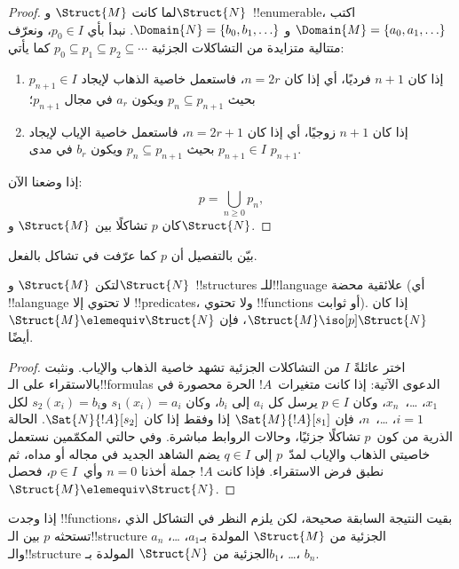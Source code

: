 \documentclass[../../../include/open-logic-section]{subfiles}
\begin{document}
\begin{proof}
  لما كانت $\Struct{M}$ و$\Struct{N}$~!!{enumerable}، اكتب
  $\Domain{M} = \{a_0, a_1, \ldots \}$ و
  $\Domain{N} = \{b_0, b_1, \ldots \}$. نبدأ بأي $p_0 \in I$، ونعرّف
  متتالية متزايدة من التشاكلات الجزئية
  $p_0 \subseteq p_1 \subseteq p_2 \subseteq \cdots$ كما يأتي:
  \begin{enumerate}
  \item إذا كان $n+1$ فرديًا، أي إذا كان $n = 2r$، فاستعمل خاصية الذهاب
    لإيجاد $p_{n+1} \in I$ بحيث $p_n \subseteq p_{n+1}$ ويكون $a_r$
    في مجال $p_{n+1}$؛
  \item إذا كان $n+1$ زوجيًا، أي إذا كان $n=2r+1$، فاستعمل خاصية الإياب
    لإيجاد $p_{n+1} \in I$ بحيث $p_n \subseteq p_{n+1}$ ويكون $b_r$
    في مدى $p_{n+1}$.
  \end{enumerate}
إذا وضعنا الآن:
\[
p = \bigcup_{n\ge 0} p_n,
\]
كان $p$ تشاكلًا بين $\Struct{M}$ و$\Struct{N}$.
\end{proof}

\begin{prob}
  بيّن بالتفصيل أن $p$ كما عرّفت في
   تشاكل بالفعل.
\end{prob}

\begin{thm}
  لتكن $\Struct{M}$ و$\Struct{N}$~!!{structure}s للـ!!{language} علائقية
  محضة (أي !!a{language} لا تحتوي إلا !!{predicate}s، ولا تحتوي
  !!{function}s أو ثوابت). إذا كان $\Struct{M} \iso[p] \Struct{N}$،
  فإن $\Struct{M} \elemequiv \Struct{N}$ أيضًا.
\end{thm}

\begin{proof}
  اختر عائلةً $I$ من التشاكلات الجزئية تشهد خاصية الذهاب والإياب. ونثبت
  بالاستقراء على الـ!!{formula}s الدعوى الآتية: إذا كانت متغيرات~$!A$
  الحرة محصورة في $x_1$، \dots،~$x_n$، وكان $p\in I$ يرسل كل $a_i$
  إلى $b_i$، وكان $s_1(x_i)=a_i$ و$s_2(x_i)=b_i$ لكل $i=1$، \dots،~$n$،
  فإن $\Sat{M}{!A}[s_1]$ إذا وفقط إذا كان $\Sat{N}{!A}[s_2]$.
  الحالة الذرية من كون~$p$ تشاكلًا جزئيًا، وحالات الروابط مباشرة. وفي
  حالتي المكمّمين نستعمل خاصيتي الذهاب والإياب لمدّ~$p$ إلى $q\in I$
  يضم الشاهد الجديد في مجاله أو مداه، ثم نطبق فرض الاستقراء. فإذا كانت
  $!A$ جملة أخذنا $n=0$ وأي~$p\in I$، فحصل
  $\Struct{M} \elemequiv \Struct{N}$.
\end{proof}

\begin{rem}
إذا وجدت !!{function}s، بقيت النتيجة السابقة صحيحة، لكن يلزم النظر في
التشاكل الذي تستحثه $p$ بين الـ!!{structure} الجزئية من $\Struct{M}$
المولدة بـ$a_1$، \dots، $a_n$ والـ!!{structure} الجزئية من
$\Struct{N}$ المولدة بـ$b_1$، \dots، $b_n$.
\end{rem}
\end{document}
